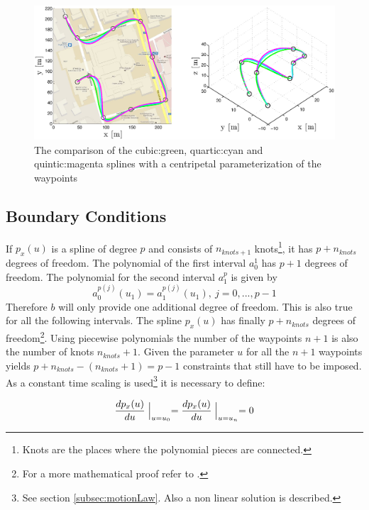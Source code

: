 \begin{figure}[H]
	\centering
    \includegraphics[width = \textwidth]{graphics/DegreeCentripetal_road_agile.eps}
  \caption{The comparison of the cubic:green, quartic:cyan and quintic:magenta splines with a centripetal parameterization of the waypoints}
  \label{fig:degreeCentripetal}
\end{figure} 






\subsection{Boundary Conditions}
\label{subsec:boundary conditions}

If $p_x(u)$ is a spline of degree $p$ and consists of $n_{knots+1}$ knots\footnote{Knots are the places where the polynomial pieces are connected.}, it has $p+n_{knots}$ degrees of freedom. The polynomial of the first interval $a_0^1$ has $p+1$ degrees of freedom. The polynomial for the second interval $a_1^p$ is given by
\begin{equation*}
a_0^{p(j)}(u_1)=a_1^{p(j)}(u_1),~j=0,...,p-1
\end{equation*}
Therefore $b$ will only provide one additional degree of freedom. This is also true for all the following intervals. The spline $p_x(u)$ has finally $p+n_{knots}$ degrees of freedom\footnote{For a more mathematical proof refer to \cite{dahmen}.}. Using piecewise polynomials the number of the waypoints $n+1$ is also the number of knots $n_{knots}+1$. Given the parameter $u$ for all the $n+1$ waypoints yields $p+n_{knots}-(n_{knots}+1) = p-1$ constraints that still have to be imposed. As a constant time scaling is used\footnote{ See section \ref{subsec:motionLaw}. Also a non linear solution is described.} it is necessary to define:

\begin{equation*}
\frac{dp_x(u)}{du} \Bigm|_{u=u_0} = \frac{dp_x(u)}{du} \Bigm|_{u=u_n}=0
\end{equation*}

